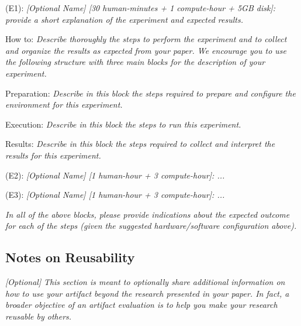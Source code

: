 \begin{compactdesc}

    \item[(E1):] \textit{[Optional Name] [30 human-minutes + 1 compute-hour + 5GB disk]:
    provide a short explanation of the experiment and expected results.}

    \begin{asparadesc}
        \item[How to:]  \textit{Describe thoroughly the steps to perform the
        experiment and to collect and organize the results as expected from your
        paper. We encourage you to use the following structure with three main
        blocks for the description of your experiment.}

        \item[Preparation:] \textit{Describe in this block the steps required to
        prepare and configure the environment for this experiment.}

        \item[Execution:]
        \textit{Describe in this block the steps to run this experiment.}

        \item[Results:] \textit{Describe in this block the steps required to
        collect and interpret the results for this experiment.}
    \end{asparadesc}

    \item[(E2):] \textit{[Optional Name] [1 human-hour + 3 compute-hour]: ...}

    \item[(E3):] \textit{[Optional Name] [1 human-hour + 3 compute-hour]: ...}

\end{compactdesc}

\textit{In all of the above blocks, please provide indications about the
 expected outcome for each of the steps (given the suggested hardware/software
 configuration above).}

\subsection{Notes on Reusability}
\label{sec:reuse}
{\em [Optional]} \textit{This section is meant to optionally share additional
information on how to use your artifact beyond the research presented in your
paper. In fact, a broader objective of an artifact evaluation is to help you
make your research reusable by others.}

